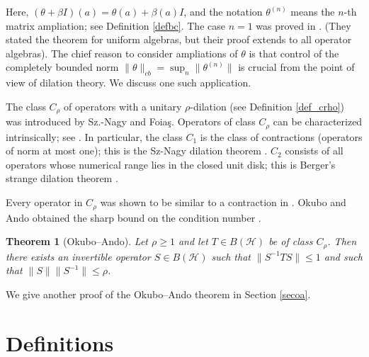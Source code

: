 \documentclass[12pt]{amsart}
\newtheorem{theorem}{Theorem}[section]
\theoremstyle{definition}
\begin{document}
Here, $(\theta + \beta I)(a) = \theta(a) + \beta(a) I$, and the notation $\theta^{(n)}$ means the $n$-th matrix ampliation; see Definition \ref{defbc}.
The case $n=1$ was proved in \cite[Thm. 4.1]{COR23}. (They stated the theorem for uniform algebras, but their proof extends to all operator algebras). 
The chief reason to consider ampliations of $\theta$ is that control of the completely bounded norm $\|\theta\|_{cb} = \sup_{n} \|\theta^{(n)}\|$
is crucial from the point of view of dilation theory. We discuss one such application.

The class $C_\rho$ of operators with a unitary $\rho$-dilation (see Definition \ref{def_crho}) was introduced by Sz.-Nagy and Foia\c{s}.
Operators of class $C_\rho$ can be characterized intrinsically; see \cite[Section I.11]{SFB+10}.
In particular, the class $C_1$ is the class of contractions (operators of norm at most one); this is the Sz-Nagy dilation theorem
\cite{Sz.-Nagy53}.
 $C_{2}$ consists of all operators whose numerical range lies in the closed unit disk; this is Berger's strange dilation theorem \cite{Berger65}.

Every operator in $C_\rho$ was shown to be  similar to a contraction in \cite{SF67}. Okubo and Ando obtained the sharp bound on the condition number \cite{OA75}.
\begin{theorem}[Okubo--Ando]
  \label{thm:OA}
  Let $\rho \ge 1$ and let $T \in B(\mathcal{H})$ be of class $C_{\rho}$. Then there exists an invertible
  operator $S \in B(\mathcal{H})$ such that $\|S^{-1} T S\| \le 1$ and such that $\|S\| \|S^{-1}\| \le \rho$.
\end{theorem}

We give another proof of the Okubo--Ando theorem in Section \ref{secoa}.



\section{Definitions}
\end{document}

